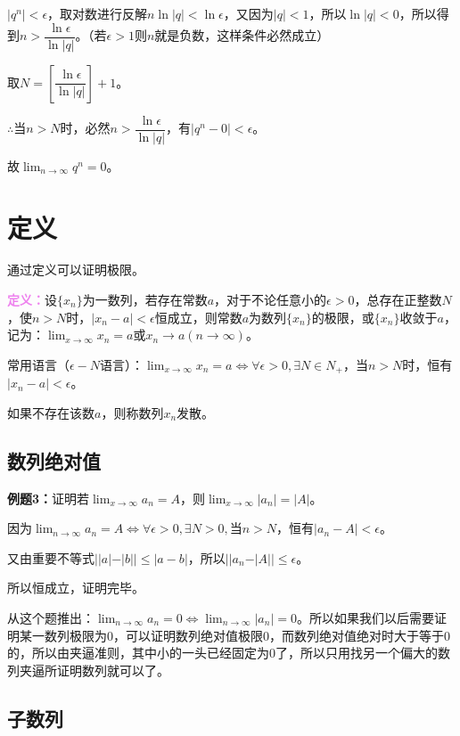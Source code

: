 \documentclass[UTF8]{ctexart}
\begin{document}
$\vert q^n\vert<\epsilon$，取对数进行反解$n\ln\vert q\vert<\ln\epsilon$，又因为$\vert q\vert<1$，所以$\ln\vert q\vert<0$，所以得到$n>\dfrac{\ln\epsilon}{\ln\vert q\vert}$。（若$\epsilon>1$则$n$就是负数，这样条件必然成立）

取$N=\left[\dfrac{\ln\epsilon}{\ln\vert q\vert}\right]+1$。

$\therefore$当$n>N$时，必然$n>\dfrac{\ln\epsilon}{\ln\vert q\vert}$，有$\vert q^n-0\vert<\epsilon$。

故$\lim_{n\to\infty}q^n=0$。

\section{定义}

通过定义可以证明极限。

\textcolor{violet}{\textbf{定义：}}设$\{x_n\}$为一数列，若存在常数$a$，对于不论任意小的$\epsilon>0$，总存在正整数$N$，使$n>N$时，$\vert x_n-a\vert<\epsilon$恒成立，则常数$a$为数列$\{x_n\}$的极限，或$\{x_n\}$收敛于$a$，记为：$\lim_{x\to\infty}x_n=a$或$x_n\to a(n\to\infty)$。

常用语言（$\epsilon-N$语言）：$\lim_{x\to\infty}x_n=a\Leftrightarrow\forall\epsilon>0,\exists N\in N_+$，当$n>N$时，恒有$\vert x_n-a\vert<\epsilon$。

如果不存在该数$a$，则称数列$x_n$发散。

\subsection{数列绝对值}

\textbf{例题3：}证明若$\lim_{x\to\infty}a_n=A$，则$\lim_{x\to\infty}\vert a_n\vert=\vert A\vert$。

因为$\lim_{n\to\infty}a_n=A\Leftrightarrow\forall\epsilon>0,\exists N>0,\text{当}n>N$，恒有$\vert a_n-A\vert<\epsilon$。

又由重要不等式$\vert\vert a\vert-\vert b\vert\vert\leqslant\vert a-b\vert$，所以$\vert\vert a_n-\vert A\vert\vert\leqslant\epsilon$。

所以恒成立，证明完毕。

从这个题推出：$\lim_{n\to\infty}a_n=0\Leftrightarrow\lim_{n\to\infty}\vert a_n\vert=0$。所以如果我们以后需要证明某一数列极限为0，可以证明数列绝对值极限0，而数列绝对值绝对时大于等于0的，所以由夹逼准则，其中小的一头已经固定为0了，所以只用找另一个偏大的数列夹逼所证明数列就可以了。

\subsection{子数列}
\end{document}

